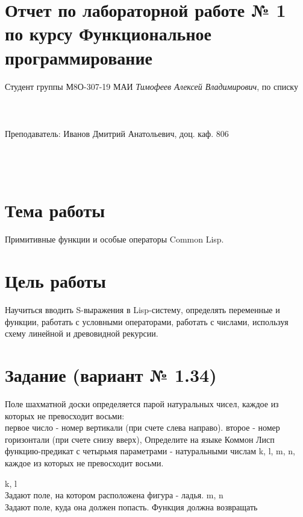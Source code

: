 \documentclass[12pt]{article}
\begin{document}
\section*{Отчет по лабораторной работе № 1 \\
по курсу \guillemotleft Функциональное программирование\guillemotright}
\begin{flushright}
Студент группы М8О-307-19 МАИ \textit{Тимофеев Алексей Владимирович},  по списку \\
 \\
 \\
\ \\
Преподаватель: Иванов Дмитрий Анатольевич, доц. каф. 806 \\
 \\
 \\
 \\

\end{flushright}

\section{Тема работы}
Примитивные функции и особые операторы Common Lisp.

\section{Цель работы}
Научиться вводить S-выражения в Lisp-систему, определять переменные и функции, работать с условными операторами, работать с числами, используя схему линейной и древовидной рекурсии.

\section{Задание (вариант № 1.34)}
Поле шахматной доски определяется парой натуральных чисел, каждое из которых не превосходит восьми:\\
первое число - номер вертикали (при счете слева направо).
второе - номер горизонтали (при счете снизу вверх),
Определите на языке Коммон Лисп функцию-предикат с четырьмя параметрами - натуральными числам k, l, m, n, каждое из которых не превосходит восьми.

k, l\\
Задают поле, на котором расположена фигура - ладья.
m, n\\
Задают поле, куда она должен попасть.
Функция должна возвращать
\end{document}
